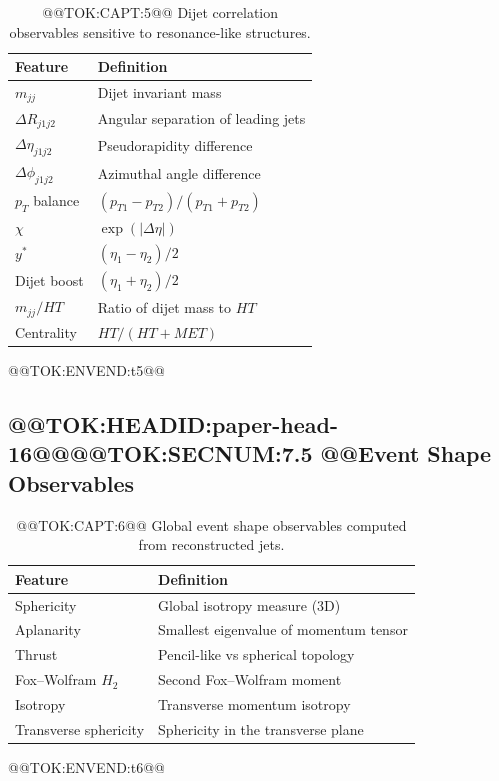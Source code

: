 \documentclass[11pt]{article}
\begin{document}
\begin{table}[H]
\centering
\caption{@@TOK:CAPT:5@@ Dijet correlation observables sensitive to resonance-like structures.}
\footnotesize

\begin{tabular}{ll}
\toprule
Feature & Definition \\
\midrule
$m_{jj}$ & Dijet invariant mass \\
$\Delta R_{j1j2}$ & Angular separation of leading jets \\
$\Delta \eta_{j1j2}$ & Pseudorapidity difference \\
$\Delta \phi_{j1j2}$ & Azimuthal angle difference \\
$p_T$ balance & $(p_{T1}-p_{T2})/(p_{T1}+p_{T2})$ \\
$\chi$ & $\exp(|\Delta \eta|)$ \\
$y^\ast$ & $(\eta_1 - \eta_2)/2$ \\
Dijet boost & $(\eta_1 + \eta_2)/2$ \\
$m_{jj}/HT$ & Ratio of dijet mass to $HT$ \\
Centrality & $HT/(HT + MET)$ \\
\bottomrule
\end{tabular}

@@TOK:ENVEND:t5@@\end{table}

\subsection{@@TOK:HEADID:paper-head-16@@@@TOK:SECNUM:7.5 @@Event Shape Observables}

\begin{table}[H]
\centering
\caption{@@TOK:CAPT:6@@ Global event shape observables computed from reconstructed jets.}
\footnotesize

\begin{tabular}{ll}
\toprule
Feature & Definition \\
\midrule
Sphericity & Global isotropy measure (3D) \\
Aplanarity & Smallest eigenvalue of momentum tensor \\
Thrust & Pencil-like vs spherical topology \\
Fox--Wolfram $H_2$ & Second Fox--Wolfram moment \\
Isotropy & Transverse momentum isotropy \\
Transverse sphericity & Sphericity in the transverse plane \\
\bottomrule
\end{tabular}

@@TOK:ENVEND:t6@@\end{table}
\end{document}
